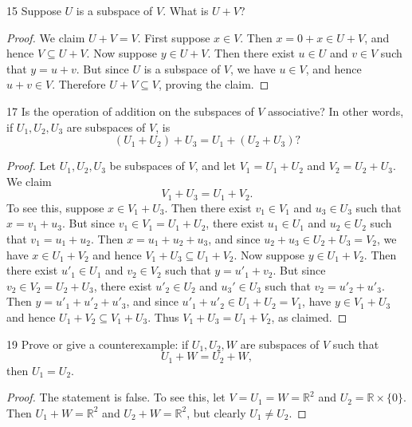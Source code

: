 \documentclass{extarticle}
\newenvironment{problem}[1]{\begin{prob*}{#1}{}}{\end{prob*}}
\newcommand{\R}{\mathbb{R}}
\begin{document}
\begin{problem}{15}
Suppose $U$ is a subspace of $V$.  What is $U+V$?
\end{problem}
\begin{proof}
We claim $U+V=V$.  First suppose $x \in V$.  Then $x = 0 + x \in U + V$, and hence $V\subseteq U + V$.  Now suppose $y\in U + V$.  Then there exist $u\in U$ and $v\in V$ such that $y = u + v$.  But since $U$ is a subspace of $V$, we have $u\in V$, and hence $u+v\in V$.  Therefore $U+V\subseteq V$, proving the claim.
\end{proof}

\begin{problem}{17}
Is the operation of addition on the subspaces of $V$ associative?  In other words, if $U_1, U_2, U_3$ are subspaces of $V$, is 
\begin{equation*}
(U_1 + U_2) + U_3 = U_1 + (U_2 + U_3)?
\end{equation*}
\end{problem}
\begin{proof}
Let $U_1,U_2,U_3$ be subspaces of $V$, and let $V_1 = U_1 + U_2$ and $V_2 = U_2 + U_3$.  We claim
\begin{equation*}
V_1 + U_3 = U_1 + V_2.
\end{equation*}
To see this, suppose $x \in V_1 + U_3$.  Then there exist $v_1\in V_1$ and $u_3\in U_3$ such that $x = v_1 + u_3$.  But since $v_1\in V_1=U_1 + U_2$, there exist $u_1\in U_1$ and $u_2\in U_2$ such that $v_1 = u_1 + u_2$.  Then $x = u_1 + u_2 + u_3$, and since $u_2 + u_3\in U_2+U_3 = V_2$, we have $x\in U_1 + V_2$ and hence $V_1 + U_3\subseteq U_1 + V_2$.  Now suppose $y\in U_1 + V_2$.  Then there exist $u'_1\in U_1$ and $v_2 \in V_2$ such that $y = u'_1 + v_2$.  But since $v_2 \in V_2 = U_2 + U_3$, there exist $u'_2\in U_2$ and $u_3'\in U_3$ such that $v_2 = u'_2 + u'_3$.   Then $y=u'_1 + u'_2 + u'_3$, and since $u'_1+u'_2\in U_1 + U_2 = V_1$, have $y\in V_1 + U_3$ and hence $U_1 + V_2\subseteq V_1 + U_3$.  Thus $V_1 + U_3 = U_1 + V_2$, as claimed.
\end{proof}

\begin{problem}{19}
Prove or give a counterexample: if $U_1,U_2,W$ are subspaces of $V$ such that 
\begin{equation*}
U_1 + W = U_2 + W,
\end{equation*}
then $U_1 = U_2$.
\end{problem}
\begin{proof}
The statement is false.  To see this, let $V = U_1 = W = \R^2$ and $U_2 = \R\times\{0\}$.  Then $U_1 + W = \R^2$ and $U_2 + W = \R^2$, but clearly $U_1\neq U_2$.
\end{proof}
\end{document}

